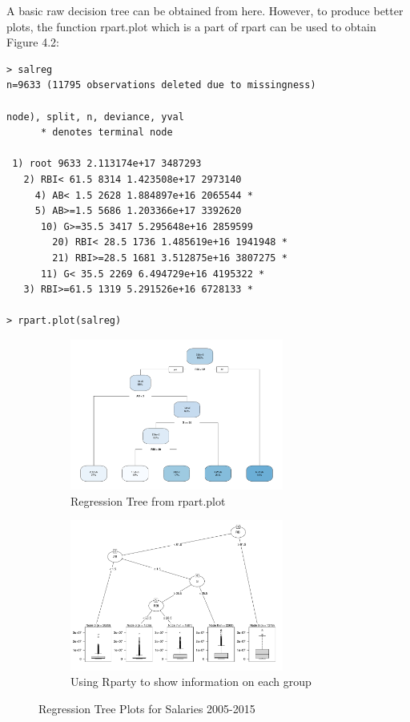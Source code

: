 \documentclass[11pt,a4paper]{report}
\begin{document}
A basic raw decision tree can be obtained from here. However, to produce better plots, the function rpart.plot which is a part of rpart \cite{rpart} can be used to obtain Figure 4.2:

\begin{lstlisting}[basicstyle=\scriptsize]
> salreg
n=9633 (11795 observations deleted due to missingness)

node), split, n, deviance, yval
      * denotes terminal node

 1) root 9633 2.113174e+17 3487293  
   2) RBI< 61.5 8314 1.423508e+17 2973140  
     4) AB< 1.5 2628 1.884897e+16 2065544 *
     5) AB>=1.5 5686 1.203366e+17 3392620  
      10) G>=35.5 3417 5.295648e+16 2859599  
        20) RBI< 28.5 1736 1.485619e+16 1941948 *
        21) RBI>=28.5 1681 3.512875e+16 3807275 *
      11) G< 35.5 2269 6.494729e+16 4195322 *
   3) RBI>=61.5 1319 5.291526e+16 6728133 *
   
> rpart.plot(salreg)
\end{lstlisting}

\begin{figure}
\centering
\begin{subfigure}{.5\textwidth}
    \centering
    \includegraphics[width = 7cm]{photographs/regtree2005.pdf}
    \caption{Regression Tree from rpart.plot}
    \label{fig:regplot}
\end{subfigure}%
\begin{subfigure}{.5\textwidth}
    \centering
    \includegraphics[width = 7cm]{photographs/regparty.pdf}
    \caption{Using Rparty to show information on each group}
    \label{fig:regparty}
\end{subfigure}
\caption{Regression Tree Plots for Salaries 2005-2015}
\label{fig:regtree}
\end{figure}
\end{document}
